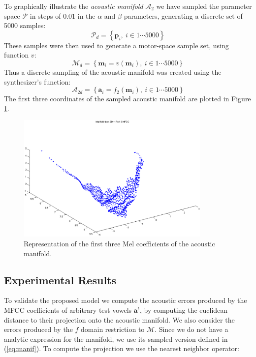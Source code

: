 To graphically illustrate the \textit{acoustic manifold}
$\mathcal{A}_2$ we have sampled the parameter space $\mathcal{P}$ in
steps of $0.01$ in the $\alpha$ and $\beta$ parameters, generating a
discrete set of 5000 samples:
\begin{equation*}
\mathcal{P}_d = \left\{ \mathbf{p}_i,\ i \in 1 \cdots 5000 \right\}
\end{equation*} 
These samples were then used to generate a motor-space sample set,
using function $v$:
\begin{equation*}
\mathcal{M}_d = \left\{ \mathbf{m}_i = v(\mathbf{m}_i),\  i \in 1 \cdots 5000 \right\}
\end{equation*} 
Thus a discrete sampling of the acoustic manifold was created using
the synthesizer's function:
\begin{equation}
\mathcal{A}_{2d} = \left\{ \mathbf{a}_i = f_2(\mathbf{m}_i), \ i \in 1 \cdots 5000 \right\}
\label{eq:manif}
\end{equation} 
The first three coordinates of the sampled acoustic manifold are
plotted in Figure \ref{fig:manif}.
\begin{figure}[!h]
  \centering
  \includegraphics[width=95mm]{include/vowels/images/manifold}
  \caption{Representation of the first three Mel coefficients of the
    acoustic manifold.}
  \label{fig:manif}
\end{figure}

\subsection{Experimental Results}
To validate the proposed model we compute the acoustic errors produced
by the MFCC coefficients of arbitrary test vowels $\mathbf{a}^t$, by
computing the euclidean distance to their projection onto the acoustic
manifold. We also consider the errors produced by the $f$ domain
restriction to $\mathcal{M}$. Since we do not have a analytic
expression for the manifold, we use its sampled version defined in
(\ref{eq:manif}). To compute the projection we use the nearest
neighbor operator:

